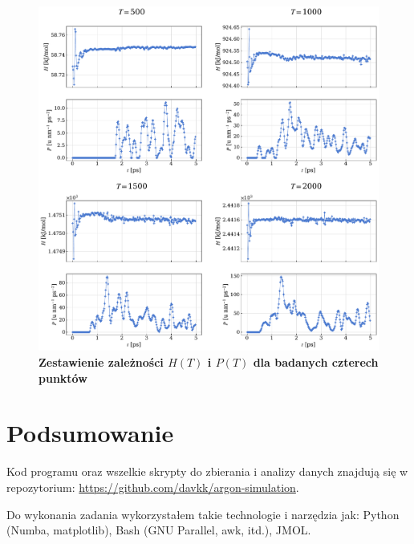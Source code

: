 \documentclass[11pt,a4paper]{article}
\begin{document}
\begin{figure}[ht!]
    \caption{\textbf{Zestawienie zależności $H(T)$ i $P(T)$ dla badanych czterech punktów}}
    \vspace{0.2cm}
    \includegraphics[width=\linewidth]{../figures/gas_stability.pdf}
\end{figure}

\clearpage

\section{Podsumowanie}

Kod programu oraz wszelkie skrypty do zbierania i analizy danych znajdują się w repozytorium: \url{https://github.com/davkk/argon-simulation}.

Do wykonania zadania wykorzystałem takie technologie i narzędzia jak: Python (Numba, matplotlib), Bash (GNU Parallel, awk, itd.), JMOL.
\end{document}
